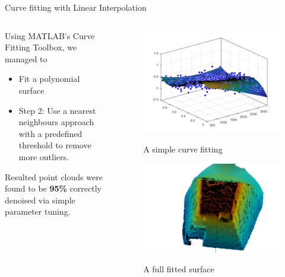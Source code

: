\documentclass{beamer}
\begin{document}
\begin{frame}{Curve fitting with Linear Interpolation}

\begin{columns}
	\begin{column}{0.5\textwidth}
		\begin{center}
Using MATLAB's Curve Fitting Toolbox, we managed to 
\begin{itemize}
	\item Fit a polynomial surface
	\item Step 2: Use a nearest neighbours approach with a predefined threshold to remove more outliers. 
\end{itemize}

Resulted point clouds were found to be \textbf{95\%} correctly denoised via simple parameter tuning.
		\end{center}
	\end{column}
	\begin{column}{0.9\textwidth}  %
		\begin{center}
			\begin{figure}
				\includegraphics[width=0.3\linewidth]{Figures/FitA}
				\label{fitA}
				\caption{A simple curve fitting}
			\end{figure}
			\begin{figure}
				\includegraphics[width=0.5\linewidth]{Figures/meshlab}
				\label{meshlab}
				\caption{A full fitted surface}
			\end{figure}
			
		\end{center}
	\end{column}
\end{columns}

\end{frame}
\end{document}
